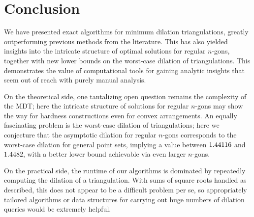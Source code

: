 \section{Conclusion}
\label{sec:conclusion}
We have presented exact algorithms for minimum dilation triangulations,
greatly outperforming previous methods from the literature.
This has also yielded insights into
the intricate structure of optimal solutions for regular $n$-gons,
together with new lower bounds on the worst-case dilation of triangulations.
This demonstrates the value of computational tools for gaining analytic insights
that seem out of reach with purely manual analysis.

On the theoretical
side, one tantalizing open question remains the complexity of
the MDT; here the intricate structure of solutions for 
regular $n$-gons may show the way for hardness constructions even for 
convex arrangements. An equally fascinating problem is 
the worst-case dilation of triangulations; here we conjecture that 
the asymptotic dilation for regular $n$-gons 
corresponds to the worst-case dilation 
for general point sets, implying a value between
$1.44116$ and $1.4482$, with a better lower 
bound achievable via even larger $n$-gons.

On the practical side, the runtime of our algorithms 
is dominated by repeatedly computing the dilation of a triangulation.
With sums of square roots handled as described,
this does not appear to be a difficult problem per se,
so appropriately tailored algorithms or data structures 
for carrying out huge numbers of dilation queries
would be extremely helpful.
